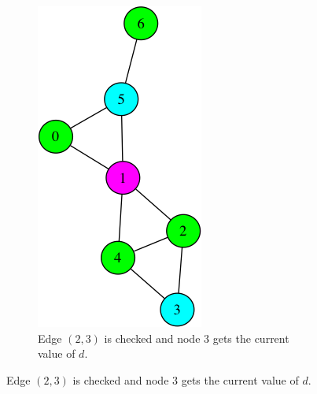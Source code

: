 \begin{figure}
\vspace{2cm}

\begin{subfigure}{0.20\textwidth}
\includegraphics[width=\linewidth]{images/coloring/4.png}
\caption{Edge $(2,3)$ is checked and node $3$ gets the current value of $d$.} \label{fig:coloring5}

\end{subfigure}
\end{figure}
